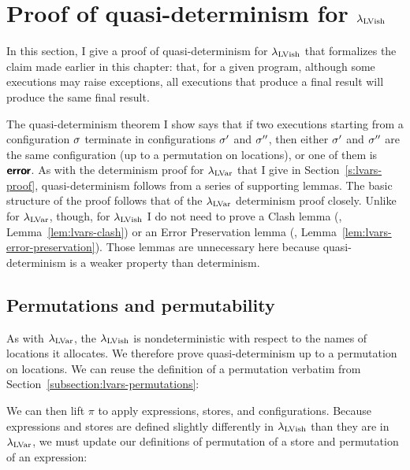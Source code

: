 \section{Proof of quasi-determinism for $\lambda_{\textrm{LVish}}$}\label{s:quasi-proof-of-quasi-determinism}

In this section, I give a proof of quasi-determinism for
$\lambda_{\textrm{LVish}}$ that formalizes the claim made earlier in this chapter:
that, for a given program, although some executions may raise
exceptions, all executions that produce a final result will produce
the same final result.

The quasi-determinism theorem I show says that if two executions
starting from a configuration $\sigma$ terminate in configurations
$\sigma'$ and $\sigma''$, then either $\sigma'$ and $\sigma''$ are the
same configuration (up to a permutation on locations), or one of them
is $\textbf{\textsf{error}}$.  As with the determinism proof for $\lambda_{\textrm{LVar}}$ that I
give in Section~\ref{s:lvars-proof}, quasi-determinism follows from a
series of supporting lemmas.  The basic structure of the proof follows
that of the $\lambda_{\textrm{LVar}}$ determinism proof closely.  Unlike for
$\lambda_{\textrm{LVar}}$, though, for $\lambda_{\textrm{LVish}}$ I do not need to prove a
Clash lemma (\eg, Lemma~\ref{lem:lvars-clash}) or an Error
Preservation lemma (\eg, Lemma~\ref{lem:lvars-error-preservation}).
Those lemmas are unnecessary here because quasi-determinism is a
weaker property than determinism.

\subsection{Permutations and permutability}\label{subsection:quasi-permutations}

As with $\lambda_{\textrm{LVar}}$, the $\lambda_{\textrm{LVish}}$ is nondeterministic with
respect to the names of locations it allocates.  We therefore prove
quasi-determinism up to a permutation on locations.  We can reuse the
definition of a permutation verbatim from
Section~\ref{subsection:lvars-permutations}:

\DefPermutation

We can then lift $\pi$ to apply expressions, stores, and
configurations.  Because expressions and stores are defined slightly
differently in $\lambda_{\textrm{LVish}}$ than they are in $\lambda_{\textrm{LVar}}$, we must
update our definitions of permutation of a store and permutation of an
expression:

\DefPermutationExpression

\DefPermutationStore

